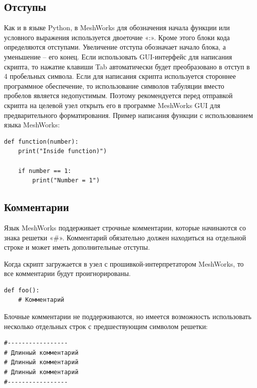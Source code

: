 \documentclass[12pt]{article}
\begin{document}
\subsection{Отступы}
Как и в языке Python, в MeshWorks для обозначения начала функции или условного 
выражения используется двоеточие «:». Кроме этого блоки кода определяются отступами. 
Увеличение отступа обозначает начало блока, а уменьшение – его конец. Если 
использовать GUI-интерфейс для написания скрипта, то нажатие клавиши Tab автоматически 
будет преобразовано в отступ в 4 пробельных символа. Если для написания скрипта 
используется стороннее программное обеспечение, то использование символов табуляции 
вместо пробелов является недопустимым. Поэтому рекомендуется перед отправкой скрипта 
на целевой узел открыть его в программе MeshWorks GUI для предварительного форматирования.
Пример написания функции с использованием языка MeshWorks:
\begin{verbatim}
def function(number):
    print("Inside function)")
    
    if number == 1:
        print("Number = 1")
\end{verbatim}

\subsection{Комментарии}
Язык MeshWorks поддерживает строчные комментарии, которые начинаются со знака 
решетки «\#». Комментарий обязательно должен находиться на отдельной строке и 
может иметь дополнительные отступы.

Когда скрипт загружается в узел с прошивкой-интерпретатором MeshWorks, то все 
комментарии будут проигнорированы.
\begin{verbatim}
def foo():
    # Комментарий
\end{verbatim}

Блочные комментарии не поддерживаются, но имеется возможность использовать 
несколько отдельных строк с предшествующим символом решетки:
\begin{verbatim}
#-----------------
# Длинный комментарий
# Длинный комментарий
# Длинный комментарий
#-----------------
\end{verbatim}
\end{document}
